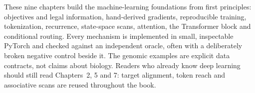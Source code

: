 These nine chapters build the machine-learning foundations from first principles: objectives and legal information, hand-derived gradients, reproducible training, tokenization, recurrence, state-space scans, attention, the Transformer block and conditional routing. Every mechanism is implemented in small, inspectable PyTorch and checked against an independent oracle, often with a deliberately broken negative control beside it. The genomic examples are explicit data contracts, not claims about biology. Readers who already know deep learning should still read Chapters~2, 5 and 7: target alignment, token reach and associative scans are reused throughout the book.
